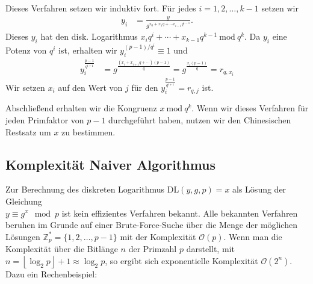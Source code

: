 \documentclass[
  a4paper,
  11pt,
]{scrartcl}
\theoremstyle{plain}
\theoremstyle{definition}
\theoremstyle{remark}
\newcommand{\Z}{\mathbb{Z}}
\newcommand{\Mod}[1]{\ \mathrm{mod}\ #1}
\begin{document}
Dieses Verfahren setzen wir induktiv fort. Für jedes $i = 1, 2, \ldots, k-1$
setzen wir
\begin{align*}
  y_i & = \frac{y}{g^{x_0 + x_1 q + \cdots x_{i-1} q^{i-1}}}.
\end{align*}
Dieses $y_i$ hat den disk. Logarithmus
$x_i q^i + \cdots + x_{k-1} q^{k-1} \Mod{q^k}$. Da $y_i$ eine Potenz von $q^i$
ist, erhalten wir $y_i^{(p-1)/q^i} \equiv 1$ und
\begin{align*}
  y_i^{\frac{p-1}{q^{i+1}}} &
    = g^{\frac{(x_i + x_{i+1} q + \cdots) (p-1)}{q}}
    = g^{\frac{x_i (p-1)}{q}}
    = r_{q, x_i}
\end{align*}
Wir setzen $x_i$ auf den Wert von $j$ für den
$y_i^{\frac{p-1}{q^{i+1}}} = r_{q, j}$ ist.

Abschließend erhalten wir die Kongruenz $x \Mod{q^k}$. Wenn wir dieses Verfahren
für jeden Primfaktor von $p-1$ durchgeführt haben, nutzen wir den Chinesischen
Restsatz um $x$ zu bestimmen.


\subsection{Komplexität Naiver Algorithmus}
\label{sub:komplexitaet_naiver_algorithmus}

Zur Berechnung des diskreten Logarithmus $\text{DL}(y,g,p) = x$ als Lösung der Gleichung\\
$y \equiv g^x \mod p$ ist kein effizientes Verfahren bekannt. Alle bekannten
Verfahren beruhen im Grunde auf einer Brute-Force-Suche über die Menge der
möglichen Lösungen $\Z_p^* = \{1, 2, \ldots, p-1\}$ mit der Komplexität
$\mathcal{O}(p)$.
Wenn man die Komplexität über die Bitlänge $n$ der Primzahl $p$ darstellt, mit
$n = \left\lfloor \log_2 p \right\rfloor + 1 \approx \log_2 p$, so ergibt sich
exponentielle Komplexität $\mathcal{O}(2^n)$. Dazu ein Rechenbeispiel:
\end{document}
